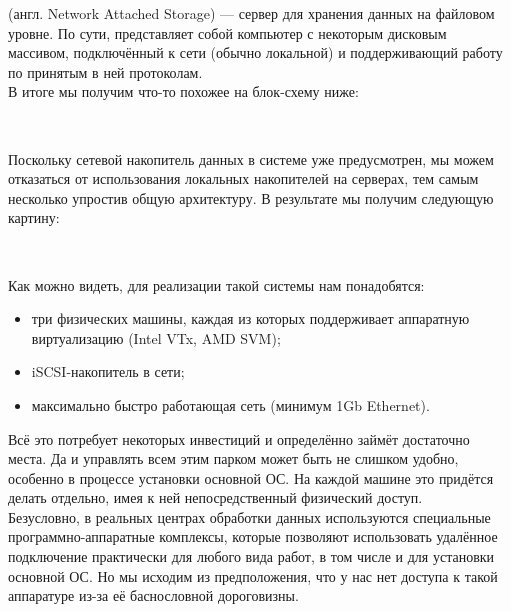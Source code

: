 \documentclass[14pt, a4paper]{article}
\begin{document}
\href{https://ru.wikipedia.org/wiki/NAS}{} (англ. Network Attached Storage) — сервер для хранения данных на файловом уровне. По сути,
представляет собой компьютер с некоторым дисковым массивом, подключённый к сети (обычно
локальной) и поддерживающий работу по принятым в ней протоколам.\\

В итоге мы получим что-то похожее на блок-схему ниже:

\begin{figure}[h]
    \centering
    \\ 
    \label{framework} 
\end{figure}

Поскольку сетевой накопитель данных в системе уже предусмотрен, мы можем отказаться от
использования локальных накопителей на серверах, тем самым несколько упростив общую
архитектуру. В результате мы получим следующую картину:

\begin{figure}[h]
    \centering
    \\ 
    \label{framework} 
\end{figure}

Как можно видеть, для реализации такой системы нам понадобятся:
\begin{itemize}
    \item три физических машины, каждая из которых поддерживает аппаратную виртуализацию (Intel
    VTx, AMD SVM);
    \item iSCSI-накопитель в сети;
    \item максимально быстро работающая сеть (минимум 1Gb Ethernet).
\end{itemize}

Всё это потребует некоторых инвестиций и определённо займёт достаточно места. Да и управлять
всем этим парком может быть не слишком удобно, особенно в процессе установки основной ОС. На
каждой машине это придётся делать отдельно, имея к ней непосредственный физический доступ.\\

Безусловно, в реальных центрах обработки данных используются специальные
программно-аппаратные комплексы, которые позволяют использовать удалённое подключение
практически для любого вида работ, в том числе и для установки основной ОС. Но мы исходим из
предположения, что у нас нет доступа к такой аппаратуре из-за её баснословной дороговизны.\\
\end{document}
